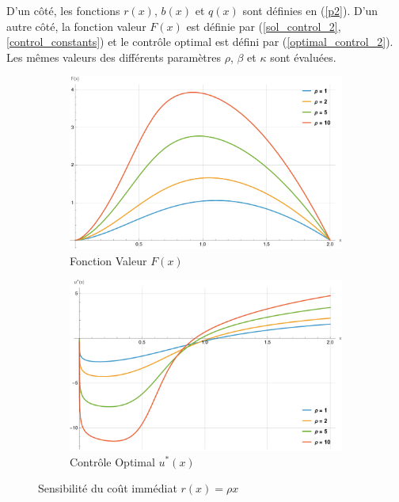 D'un côté, les fonctions $r(x)$, $b(x)$ et $q(x)$ sont définies en (\ref{p2}). D'un autre côté, la fonction valeur $F(x)$ est définie par (\ref{sol_control_2},\ref{control_constants}) et le contrôle optimal est défini par (\ref{optimal_control_2}). Les mêmes valeurs des différents paramètres $\rho$, $\beta$ et $\kappa$ sont évaluées.
\begin{figure}[htb]
    \centering
    \begin{subfigure}{0.49\linewidth}
        \includegraphics[width=\linewidth]{img/validation/P2/p2_R_value.pdf}
        \caption{Fonction Valeur $F(x)$}\label{fig:RhoValueVisualisation2}
    \end{subfigure}
    \hfill
    \begin{subfigure}{0.49\linewidth}
        \includegraphics[width=\linewidth]{img/validation/P2/p2_R_control.pdf}
        \caption{Contrôle Optimal $u^*(x)$}\label{fig:RhoControlVisualisation2}
    \end{subfigure}
    \caption{Sensibilité du coût immédiat $r(x)=\rho x$}\label{fig:RhoValueControlComparison2}
\end{figure}
